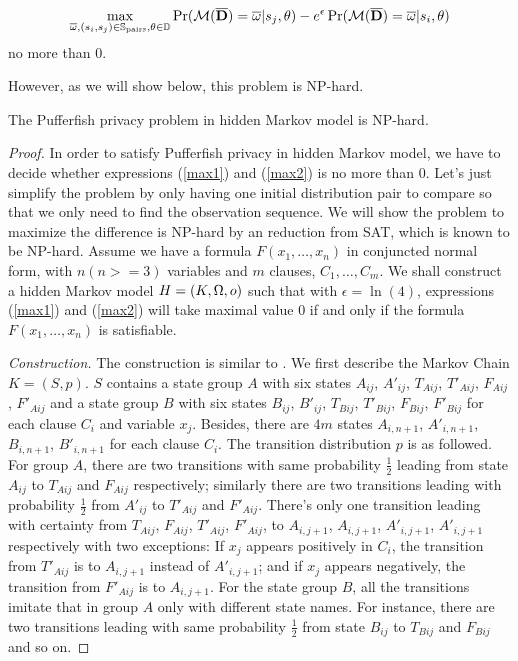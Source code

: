   \begin{equation}\label{max2}
     \max_{\overline{\omega},(s_i, s_j) \in
    \mathbb{S}_{\textmd{pairs}},\theta \in \mathbb{D}}
     { \Pr (\mathcal{M} (\overline{\mathbf{D}}) = \overline{\omega}| s_j, \theta) - e^\epsilon \Pr (\mathcal{M} (\overline{\mathbf{D}}) = \overline{\omega}| s_i, \theta) }
  \end{equation}
no more than $0$.

However, as we will show below, this problem is NP-hard.

\begin{theorem}
  The Pufferfish privacy problem in hidden Markov model is NP-hard.
\end{theorem}

\begin{proof}
  In order to satisfy Pufferfish privacy in hidden Markov model, we have to decide whether
  expressions (\ref{max1}) and (\ref{max2}) is no more than $0$.
  Let's just simplify the problem by only having one initial distribution pair to compare
  so that we only need to find the observation sequence.
  We will show the problem to maximize the difference is NP-hard by
  an reduction from SAT, which is known to be NP-hard. Assume we have a formula $F(x_1,\ldots,x_n)$ in conjuncted normal form,
  with $n(n>=3)$ variables and $m$ clauses, $C_1,\ldots,C_m$. We shall construct a hidden Markov model $H = (K, \Omega, o)$
  such that with $\epsilon = \ln(4)$, expressions (\ref{max1}) and (\ref{max2}) will take maximal value $0$
  if and only if the formula $F(x_1,\ldots,x_n)$ is satisfiable.

  \textit{Construction.} The construction is similar to \cite{PCT:87:CMDP}. We first describe the Markov Chain $K =
  (S, p)$. $S$ contains a state group $A$ with six states $A_{ij}$, $A'_{ij}$, $T_{A ij}$, $T'_{Aij}$, $F_{Aij}$, $F'_{Aij}$ and
  a state group $B$ with six states $B_{ij}$, $B'_{ij}$, $T_{Bij}$, $T'_{Bij}$, $F_{Bij}$, $F'_{Bij}$
  for each clause $C_i$ and variable $x_j$. Besides, there are $4m$ states $A_{i,n+1}$, $A'_{i,n+1}$, $B_{i,n+1}$, $B'_{i,n+1}$ for each clause $C_i$.
  The transition distribution $p$ is as followed. For group $A$, there are two transitions with same probability $\frac{1}{2}$ leading from
  state $A_{ij}$ to $T_{Aij}$ and $F_{Aij}$ respectively; similarly there are two transitions leading with probability $\frac{1}{2}$
  from $A'_{ij}$ to $T'_{Aij}$ and $F'_{Aij}$. There's only one transition leading with certainty from $T_{Aij}$, $F_{Aij}$, $T'_{Aij}$, $F'_{Aij}$,
  to $A_{i,j+1}$, $A_{i,j+1}$, $A'_{i,j+1}$, $A'_{i,j+1}$ respectively with two exceptions: If $x_j$ appears positively in $C_i$,
  the transition from $T'_{Aij}$ is to $A_{i,j+1}$ instead of $A'_{i,j+1}$; and if $x_j$ appears negatively, the transition from
  $F'_{Aij}$ is to $A_{i,j+1}$. For the state group $B$, all the transitions imitate that in group $A$ only with different state names.
  For instance, there are two transitions leading with same probability $\frac{1}{2}$ from state $B_{ij}$ to $T_{Bij}$ and $F_{Bij}$ and so on.


\end{proof}
